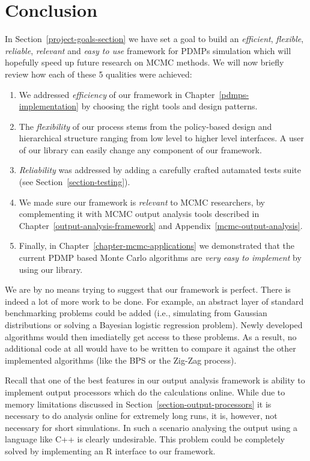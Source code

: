 \documentclass[report.tex]{subfiles}
\begin{document}
\chapter{Conclusion}

In Section~\ref{project-goals-section} we have set a goal to build an
\textit{efficient}, \textit{flexible},
\textit{reliable}, \textit{relevant} and \textit{easy to use}
framework for PDMPs simulation which will hopefully speed up future research
on MCMC methods. We will now briefly review how each of these 5 qualities were
achieved:
\begin{enumerate}
  \item We addressed \textit{efficiency} of our framework in Chapter~\ref{pdmps-implementation}
    by choosing the right tools and design patterns.
  \item The \textit{flexibility} of our process stems from the policy-based design and
    hierarchical structure ranging from low level to higher level interfaces.
    A user of our library can easily change any component of our framework.
  \item \textit{Reliability} was addressed by adding a carefully crafted autamated
    tests suite (see Section~\ref{section-testing}).
  \item We made sure our framework is \textit{relevant} to MCMC researchers,
    by complementing it with MCMC
    output analysis tools described in Chapter~\ref{output-analysis-framework} and
    Appendix~\ref{mcmc-output-analysis}.
  \item Finally, in Chapter~\ref{chapter-mcmc-applications} we demonstrated that
    the current PDMP based Monte Carlo algorithms are \textit{very easy to implement}
    by using our library.
\end{enumerate}

\noindent
We are by no means trying to suggest that our framework is perfect.
There is indeed a lot of more work to be done.
For example, an abstract layer of standard benchmarking problems could be
added (i.e., simulating from Gaussian distributions or solving a Bayesian
logistic regression problem).
Newly developed algorithms would then imediatelly get access to these
problems.
As a result, no additional code at all would
have to be written to compare it against the other implemented algorithms
(like the BPS or the Zig-Zag process).

Recall that one of the best features in our output analysis framework
is ability to implement output processors which do the calculations online.
While due to memory limitations discussed in Section~\ref{section-output-processors}
it is necessary to do analysis online for extremely long runs, it is, however,
not necessary for short simulations.
In such a scenario analysing the output using a language like C++ is clearly
undesirable.
This problem could be completely solved by implementing an R interface to our
framework.
\end{document}
